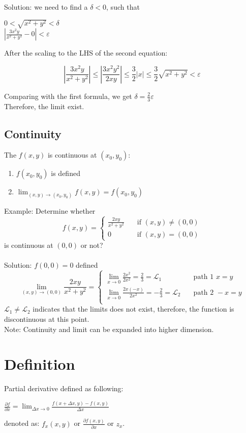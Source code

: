 \documentclass[UTF8,a4paper, 10pt, openany]{svmono}
\begin{document}
Solution: we need to find a $\delta <0$, such that
\begin{center}
$0<\sqrt{x^2+y^2}<\delta $\\
$\left|\frac{3x^2y }{x^2+y^2}-0\right|<\varepsilon$
\end{center}
After the scaling to the LHS of the second equation:

\[\left|	\frac{3x^2y }{x^2+y^2}	\right| \leq \left|\frac{3x^2y^2}{2xy}\right| \leq \frac{3}{2}|x| \leq \frac{3}{2}\sqrt{x^2+y^2}<\varepsilon \]

Comparing with the first formula, we get $\delta = \frac{2}{3}\varepsilon$\\
Therefore, the limit exist.
\subsection{Continuity}
The $f(x,y)$ is continuous at $(x_0,y_0)$:
\begin{enumerate}
\item $f(x_0,y_0)$ is defined
\item $\displaystyle\lim_{(x,y)\to (x_0,y_0)}f(x,y)=f(x_0,y_0)$
\end{enumerate}
Example: Determine whether\\
\[f(x,y)=\begin{cases}
\frac{2xy}{x^2+y^2} & \quad \text{if } (x,y)\neq (0,0)\\
0 & \quad \text{if } (x,y)= (0,0)
\end{cases}\]
is continuous at $(0,0)$ or not?\\ \\
Solution: $f(0,0)=0$ defined
\[\displaystyle\lim_{(x,y)\to (0,0)}\frac{2xy}{x^2+y^2}=\begin{cases}
\displaystyle\lim_{x\to 0}\frac{2x^2}{2x^2}=\frac{2}{3}=\mathcal{L}_1 & \quad \text{path 1 } x=y\\
\displaystyle\lim_{x\to 0}\frac{2x(-x)}{2x^2}=-\frac{2}{3}=\mathcal{L}_2 & \quad \text{path 2 } -x=y\\
\end{cases}\]
$\mathcal{L}_1\neq \mathcal{L}_2$ indicates that the limits does not exist, therefore, the function is discontinuous at this point.\\
Note: Continuity and limit can be expanded into higher dimension.

\section{Definition}
Partial derivative defined as following:
\begin{center}
$\frac{\partial f}{\partial x}=\displaystyle\lim_{\Delta x \to 0}\frac{f(x+\Delta x,y)-f(x,y)}{\Delta x}$
\end{center}
denoted as: $f_x(x,y)$ or $\frac{\partial f(x,y)}{\partial x}$ or $z_x$.
\end{document}

